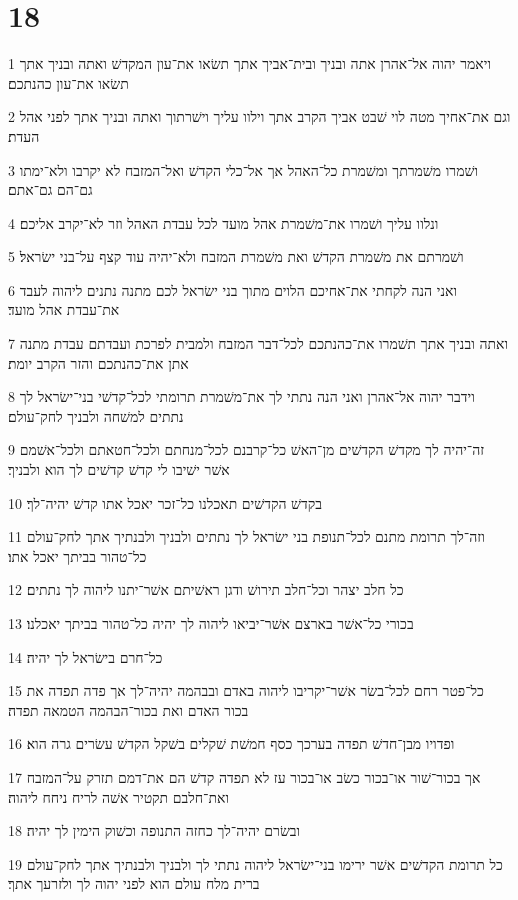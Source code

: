 \chapter{18}

\par 1 ויאמר יהוה אל־אהרן אתה ובניך ובית־אביך אתך תשׂאו את־עון המקדשׁ ואתה ובניך אתך תשׂאו את־עון כהנתכם׃
\par 2 וגם את־אחיך מטה לוי שׁבט אביך הקרב אתך וילוו עליך וישׁרתוך ואתה ובניך אתך לפני אהל העדת׃
\par 3 ושׁמרו משׁמרתך ומשׁמרת כל־האהל אך אל־כלי הקדשׁ ואל־המזבח לא יקרבו ולא־ימתו גם־הם גם־אתם׃
\par 4 ונלוו עליך ושׁמרו את־משׁמרת אהל מועד לכל עבדת האהל וזר לא־יקרב אליכם׃
\par 5 ושׁמרתם את משׁמרת הקדשׁ ואת משׁמרת המזבח ולא־יהיה עוד קצף על־בני ישׂראל׃
\par 6 ואני הנה לקחתי את־אחיכם הלוים מתוך בני ישׂראל לכם מתנה נתנים ליהוה לעבד את־עבדת אהל מועד׃
\par 7 ואתה ובניך אתך תשׁמרו את־כהנתכם לכל־דבר המזבח ולמבית לפרכת ועבדתם עבדת מתנה אתן את־כהנתכם והזר הקרב יומת׃
\par 8 וידבר יהוה אל־אהרן ואני הנה נתתי לך את־משׁמרת תרומתי לכל־קדשׁי בני־ישׂראל לך נתתים למשׁחה ולבניך לחק־עולם׃
\par 9 זה־יהיה לך מקדשׁ הקדשׁים מן־האשׁ כל־קרבנם לכל־מנחתם ולכל־חטאתם ולכל־אשׁמם אשׁר ישׁיבו לי קדשׁ קדשׁים לך הוא ולבניך׃
\par 10 בקדשׁ הקדשׁים תאכלנו כל־זכר יאכל אתו קדשׁ יהיה־לך׃
\par 11 וזה־לך תרומת מתנם לכל־תנופת בני ישׂראל לך נתתים ולבניך ולבנתיך אתך לחק־עולם כל־טהור בביתך יאכל אתו׃
\par 12 כל חלב יצהר וכל־חלב תירושׁ ודגן ראשׁיתם אשׁר־יתנו ליהוה לך נתתים׃
\par 13 בכורי כל־אשׁר בארצם אשׁר־יביאו ליהוה לך יהיה כל־טהור בביתך יאכלנו׃
\par 14 כל־חרם בישׂראל לך יהיה׃
\par 15 כל־פטר רחם לכל־בשׂר אשׁר־יקריבו ליהוה באדם ובבהמה יהיה־לך אך פדה תפדה את בכור האדם ואת בכור־הבהמה הטמאה תפדה׃
\par 16 ופדויו מבן־חדשׁ תפדה בערכך כסף חמשׁת שׁקלים בשׁקל הקדשׁ עשׂרים גרה הוא׃
\par 17 אך בכור־שׁור או־בכור כשׂב או־בכור עז לא תפדה קדשׁ הם את־דמם תזרק על־המזבח ואת־חלבם תקטיר אשׁה לריח ניחח ליהוה׃
\par 18 ובשׂרם יהיה־לך כחזה התנופה וכשׁוק הימין לך יהיה׃
\par 19 כל תרומת הקדשׁים אשׁר ירימו בני־ישׂראל ליהוה נתתי לך ולבניך ולבנתיך אתך לחק־עולם ברית מלח עולם הוא לפני יהוה לך ולזרעך אתך׃
